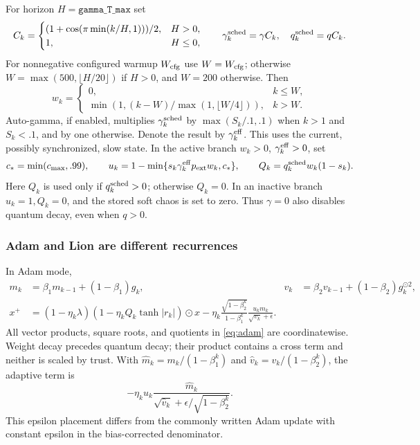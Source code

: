 \documentclass[11pt,a4paper]{article}
\theoremstyle{definition}
\theoremstyle{remark}
\begin{document}
For horizon $H=\texttt{gamma\_T\_max}$ set
\[
 C_k=\begin{cases}(1+\cos(\pi\min(k/H,1)))/2,&H>0,\\1,&H\le0,\end{cases}
 \qquad \gamma_k^{\rm sched}=\gamma C_k,\quad q_k^{\rm sched}=q C_k.
\]
For nonnegative configured warmup $W_{\rm cfg}$ use $W=W_{\rm cfg}$; otherwise
$W=\max(500,\lfloor H/20\rfloor)$ if $H>0$, and $W=200$ otherwise. Then
\[
 w_k=\begin{cases}0,&k\le W,\\
 \min(1,(k-W)/\max(1,\lfloor W/4\rfloor)),&k>W.
 \end{cases}
\]
Auto-gamma, if enabled, multiplies $\gamma_k^{\rm sched}$ by
$\max(S_k/.1,.1)$ when $k>1$ and $S_k<.1$, and by one otherwise. Denote the
result by $\gamma_k^{\rm eff}$. This uses the current, possibly synchronized,
slow state. In the active branch $w_k>0$, $\gamma_k^{\rm eff}>0$, set
\begin{equation}\label{eq:trust}
 c_* =\min(c_{\max},.99),\qquad
 u_k=1-\min\{s_k\gamma_k^{\rm eff}p_{\rm ext}w_k,c_*\},\qquad
 Q_k=q_k^{\rm sched}w_k(1-s_k).
\end{equation}
Here $Q_k$ is used only if $q_k^{\rm sched}>0$; otherwise $Q_k=0$.
In an inactive branch $u_k=1,Q_k=0$, and the stored soft chaos is set to zero.
Thus $\gamma=0$ also disables quantum decay, even when $q>0$.

\subsubsection{Adam and Lion are different recurrences}
In Adam mode,
\begin{align}
 m_k&=\beta_1m_{k-1}+(1-\beta_1)g_k,&
 v_k&=\beta_2v_{k-1}+(1-\beta_2)g_k^{\odot2},\label{eq:moments}\\
 x^+&=(1-\eta_k\lambda)
       (1-\eta_k Q_k\tanh|r_k|)\odot x
 -\eta_k\frac{\sqrt{1-\beta_2^k}}{1-\beta_1^k}
      \frac{u_km_k}{\sqrt{v_k}+\epsilon}.\label{eq:adam}
\end{align}
All vector products, square roots, and quotients in \eqref{eq:adam} are
coordinatewise. Weight decay precedes quantum decay; their product contains a
cross term and neither is scaled by trust. With $\widehat m_k=m_k/(1-\beta_1^k)$
and $\widehat v_k=v_k/(1-\beta_2^k)$, the adaptive term is
\begin{equation}\label{eq:epsilon}
 -\eta_k u_k\frac{\widehat m_k}
  {\sqrt{\widehat v_k}+\epsilon/\sqrt{1-\beta_2^k}}.
\end{equation}
This epsilon placement differs from the commonly written Adam update with
constant epsilon in the bias-corrected denominator.
\end{document}
